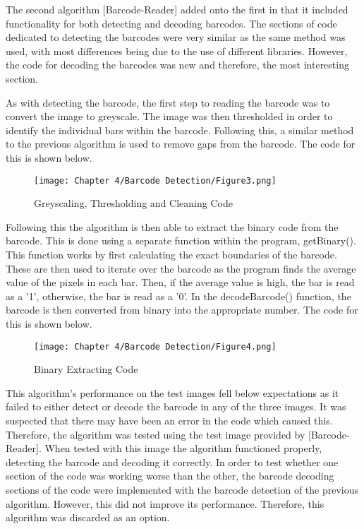 The second algorithm [Barcode-Reader] added onto the first in that it included functionality for both detecting and decoding barcodes.
The sections of code dedicated to detecting the barcodes were very similar as the same method was used, with most differences being due to the use of different libraries.
However, the code for decoding the barcodes was new and therefore, the most interesting section.

As with detecting the barcode, the first step to reading the barcode was to convert the image to greyscale.
The image was then thresholded in order to identify the individual bars within the barcode.
Following this, a similar method to the previous algorithm is used to remove gaps from the barcode.
The code for this is shown below.

\begin{figure}[H]        
    \centering
    \texttt{[image: Chapter 4/Barcode Detection/Figure3.png]}
    \caption{Greyscaling, Thresholding and Cleaning Code}
    \label{fig:bc3}
\end{figure} 

Following this the algorithm is then able to extract the binary code from the barcode.
This is done using a separate function within the program, getBinary().
This function works by first calculating the exact boundaries of the barcode.
These are then used to iterate over the barcode as the program finds the average value of the pixels in each bar.
Then, if the average value is high, the bar is read as a '1', otherwise, the bar is read as a '0'.
In the decodeBarcode() function, the barcode is then converted from binary into the appropriate number.
The code for this is shown below.

\begin{figure}[H]        
    \centering
    \texttt{[image: Chapter 4/Barcode Detection/Figure4.png]}
    \caption{Binary Extracting Code}
    \label{fig:bc4}
\end{figure} 

This algorithm's performance on the test images fell below expectations as it failed to either detect or decode the barcode in any of the three images.
It was suspected that there may have been an error in the code which caused this.
Therefore, the algorithm was tested using the test image provided by [Barcode-Reader].
When tested with this image the algorithm functioned properly, detecting the barcode and decoding it correctly.
In order to test whether one section of the code was working worse than the other, the barcode decoding sections of the code were implemented with the barcode detection of the previous algorithm.
However, this did not improve its performance.
Therefore, this algorithm was discarded as an option.

